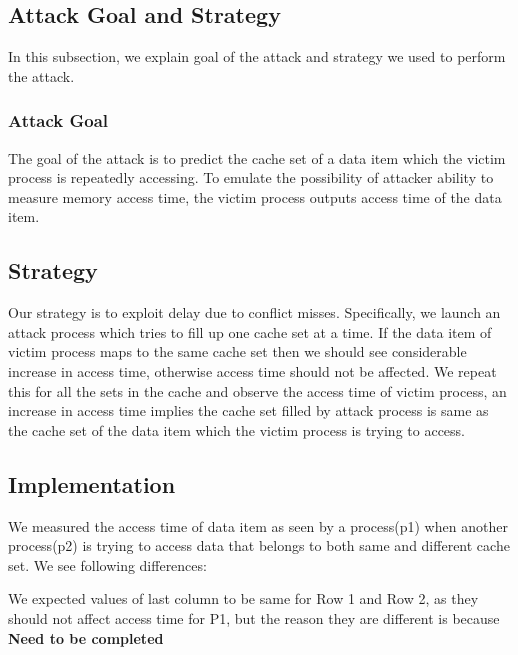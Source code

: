 \documentclass[twocolumn]{IEEEtran}
\begin{document}
\subsection {Attack Goal and Strategy}
In this subsection, we explain goal of the attack and strategy we used to perform the attack.
\subsubsection {Attack Goal}
The goal of the attack is to predict the cache set of a data item which the victim process is repeatedly accessing. To emulate the possibility of attacker ability to measure memory access time, the victim process outputs access time of the data item.
\subsection {Strategy}
Our strategy is to exploit delay due to conflict misses. Specifically, we launch an attack process which tries to fill up one cache set at a time. If the data item of victim process maps to the same cache set then we should see considerable increase in access time, otherwise access time should not be affected. We repeat this for all the sets in the cache and observe the access time of victim process, an increase in access time implies the cache set filled by attack process is same as the cache set of the data item which the victim process is trying to access.
\subsection {Implementation}
We measured the access time of data item as seen by a process(p1) when another process(p2) is trying to access data that belongs to both same and different cache set. We see following differences:
\begin{center}
\end{center}
We expected values of last column to be same for Row 1 and Row 2, as they should not affect access time for P1, but the reason they are different is because \textbf { Need to be completed }
\end{document}
